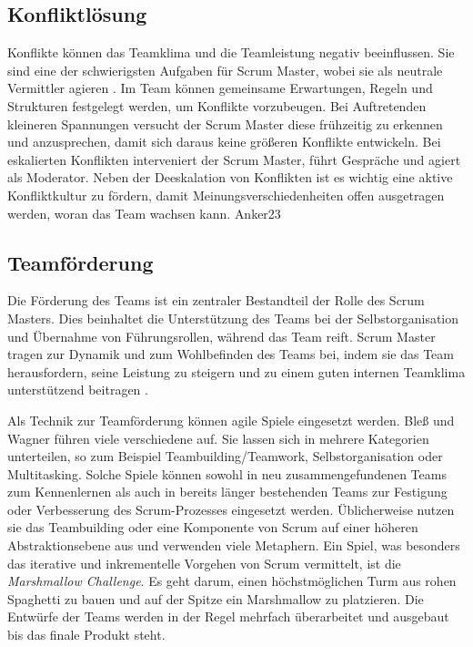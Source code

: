 \documentclass[5pt, final]{beamer}
\begin{document}
\begin{frame}[t]
\begin{multicols}{3}
			\subsection{Konfliktlösung}
			
			Konflikte können das Teamklima und die Teamleistung negativ beeinflussen. Sie sind eine der schwierigsten Aufgaben für Scrum Master, wobei sie als neutrale Vermittler agieren \cite{Noll17}.
			Im Team können gemeinsame Erwartungen, Regeln und Strukturen festgelegt werden, um Konflikte vorzubeugen. Bei Auftretenden kleineren Spannungen versucht der Scrum Master diese frühzeitig zu erkennen und anzusprechen, damit sich daraus keine größeren Konflikte entwickeln. Bei eskalierten Konflikten interveniert der Scrum Master, führt Gespräche und agiert als Moderator. Neben der Deeskalation von Konflikten ist es wichtig eine aktive Konfliktkultur zu fördern, damit Meinungsverschiedenheiten offen ausgetragen werden, woran das Team wachsen kann. {Anker23}
			
			\subsection{Teamförderung}
			
			Die Förderung des Teams ist ein zentraler Bestandteil der Rolle des Scrum Masters.
            Dies beinhaltet die Unterstützung des Teams bei der Selbstorganisation und Übernahme von Führungsrollen, während das Team reift. Scrum Master tragen zur Dynamik und zum Wohlbefinden des Teams bei, indem sie das Team herausfordern, seine Leistung zu steigern und zu einem guten internen Teamklima unterstützend beitragen \cite{Spiegler21}.
            
            Als Technik zur Teamförderung können agile Spiele eingesetzt werden.
            Bleß und Wagner \cite{bless24} führen viele verschiedene auf.
            Sie lassen sich in mehrere Kategorien unterteilen, so zum Beispiel Teambuilding/Teamwork, Selbstorganisation oder Multitasking.
            Solche Spiele können sowohl in neu zusammengefundenen Teams zum Kennenlernen als auch in bereits länger bestehenden Teams zur Festigung oder Verbesserung des Scrum-Prozesses eingesetzt werden.
            Üblicherweise nutzen sie das Teambuilding oder eine Komponente von Scrum auf einer höheren Abstraktionsebene aus und verwenden viele Metaphern.
            Ein Spiel, was besonders das iterative und inkrementelle Vorgehen von Scrum vermittelt, ist die \textit{Marshmallow Challenge}.
            Es geht darum, einen höchstmöglichen Turm aus rohen Spaghetti zu bauen und auf der Spitze ein Marshmallow zu platzieren.
            Die Entwürfe der Teams werden in der Regel mehrfach überarbeitet und ausgebaut bis das finale Produkt steht.
			

\end{multicols}
\end{frame}
\end{document}
